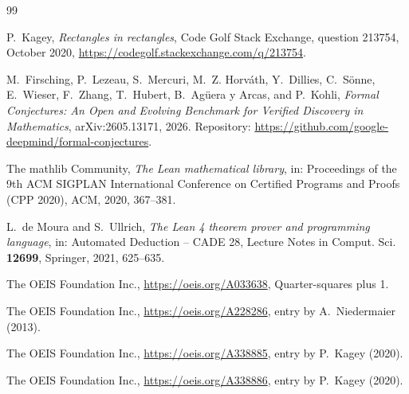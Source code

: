 \documentclass[11pt]{amsart}
\theoremstyle{plain}
\theoremstyle{definition}
\begin{document}
\begin{thebibliography}{99}

P.~Kagey, \emph{Rectangles in rectangles}, Code Golf Stack Exchange, question 213754, October 2020, \url{https://codegolf.stackexchange.com/q/213754}.

M.~Firsching, P.~Lezeau, S.~Mercuri, M.~Z. Horv\'ath, Y.~Dillies, C.~S\"onne, E.~Wieser, F.~Zhang, T.~Hubert, B.~Ag\"uera y Arcas, and P.~Kohli, \emph{Formal Conjectures: An Open and Evolving Benchmark for Verified Discovery in Mathematics}, arXiv:2605.13171, 2026. Repository: \url{https://github.com/google-deepmind/formal-conjectures}.

The mathlib Community, \emph{The Lean mathematical library}, in: Proceedings of the 9th ACM SIGPLAN International Conference on Certified Programs and Proofs (CPP 2020), ACM, 2020, 367--381.

L.~de Moura and S.~Ullrich, \emph{The Lean 4 theorem prover and programming language}, in: Automated Deduction -- CADE 28, Lecture Notes in Comput. Sci. \textbf{12699}, Springer, 2021, 625--635.

The OEIS Foundation Inc., \url{https://oeis.org/A033638}, Quarter-squares plus 1.

The OEIS Foundation Inc., \url{https://oeis.org/A228286}, entry by A.~Niedermaier (2013).

The OEIS Foundation Inc., \url{https://oeis.org/A338885}, entry by P.~Kagey (2020).

The OEIS Foundation Inc., \url{https://oeis.org/A338886}, entry by P.~Kagey (2020).

\end{thebibliography}
\end{document}
